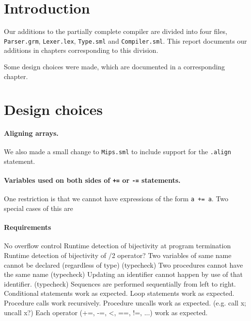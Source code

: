 \section{Introduction}
Our additions to the partially complete compiler are divided into four
files, {\tt Parser.grm}, {\tt Lexer.lex}, {\tt Type.sml} and {\tt Compiler.sml}.
This report documents our additions in chapters corresponding to this division.

Some design choices were made, which are documented in a corresponding chapter.

\section{Design choices}

\paragraph{Aligning arrays.}
We also made a small change to {\tt Mips.sml} to include support for the
{\tt .align} statement.

\paragraph{Variables used on both sides of {\tt +=} or {\tt -=} statements.}
One restriction is that we cannot have expressions of the form \verb!a += a!.
Two special cases of this are

\paragraph{Requirements}

No overflow control
Runtime detection of bijectivity at program termination
Runtime detection of bijectivity of /2 operator?
Two variables of same name cannot be declared (regardless of type) (typecheck)
Two procedures cannot have the same name (typecheck)
Updating an identifier cannot happen by use of that identifier. (typecheck)
Sequences are performed sequentially from left to right.
Conditional statements work as expected.
Loop statements work as expected.
Procedure calls work recursively.
Procedure uncalls work as expected. (e.g. call x; uncall x?)
Each operator (+=, -=, <, ==, !=, ...) work as expected.

